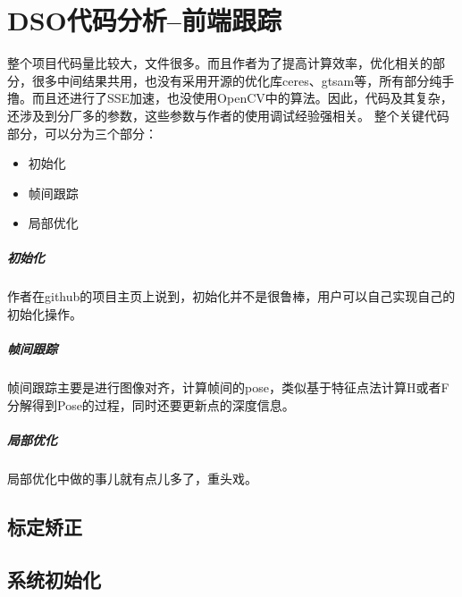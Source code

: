 \chapter{DSO代码分析--前端跟踪}

整个项目代码量比较大，文件很多。而且作者为了提高计算效率，优化相关的部分，很多中间结果共用，也没有采用开源的优化库ceres、gtsam等，所有部分纯手撸。而且还进行了SSE加速，也没使用OpenCV中的算法。因此，代码及其复杂，还涉及到分厂多的参数，这些参数与作者的使用调试经验强相关。
整个关键代码部分，可以分为三个部分：
\begin{itemize}
	\item  初始化
	\item  帧间跟踪
	\item  局部优化
\end{itemize} 
\paragraph{初始化} 作者在github的项目主页上说到，初始化并不是很鲁棒，用户可以自己实现自己的初始化操作。
\paragraph{帧间跟踪} 帧间跟踪主要是进行图像对齐，计算帧间的pose，类似基于特征点法计算H或者F分解得到Pose的过程，同时还要更新点的深度信息。
\paragraph{局部优化} 局部优化中做的事儿就有点儿多了，重头戏。


\section{标定矫正}


\section{系统初始化}


